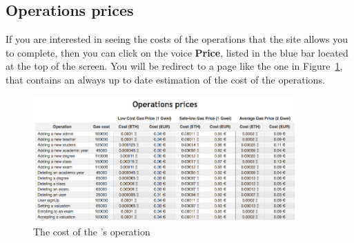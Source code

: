 \subsection{Operations prices}
If you are interested in seeing the costs of the operations that the site allows you  to complete, then you can click on the voice \textbf{Price}, listed in the blue bar located at the top of the screen. You will be redirect to a page like the one in Figure~\ref{fig:price}, that contains an always up to date estimation of the cost of the operations.
\begin{figure}[H]
	\centering
	\includegraphics[width=0.90\textwidth]{img/price.png}
	\caption{The cost of the \project's operation}
	\label{fig:price}
\end{figure}
